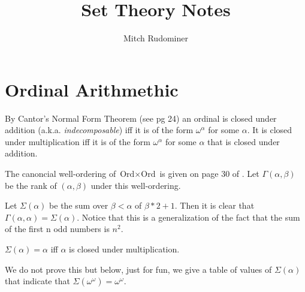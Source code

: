 \documentclass[oneside,12pt]{amsart}
\begin{document}
\title{Set Theory Notes}
\author{Mitch Rudominer}

\maketitle

\tableofcontents


\section{Ordinal Arithmethic}

By Cantor's Normal Form Theorem (see \cite{Jech_Book2} pg 24) an ordinal
is closed under addition (a.k.a. \emph{indecomposable}) iff it is of the form
$\omega^{\alpha}$ for some $\alpha$. It is closed under multiplication iff
it is of the form $\omega^{\alpha}$ for some $\alpha$ that is closed under
addition.

The canoncial well-ordering of $\text{Ord} \times \text{Ord}$ is given
on page 30 of \cite{Jech_Book2}. Let $\Gamma(\alpha,\beta)$ be the rank
of $(\alpha,\beta)$ under this well-ordering.

Let $\Sigma(\alpha)$ be the sum over $\beta<\alpha$
of $\beta*2+1$. Then it is clear that $\Gamma(\alpha,\alpha) = \Sigma(\alpha)$.
Notice that this is a generalization of the fact that the sum of the first
n odd numbers is $n^2$.

\begin{lemma}
$\Sigma(\alpha) = \alpha$ iff $\alpha$ is closed under multiplication.
\end{lemma}

We do not prove this but below, just for fun, we give a table of values of
$\Sigma(\alpha)$ that indicate that $\Sigma(\omega^{\omega})=\omega^{\omega}$.
\end{document}
